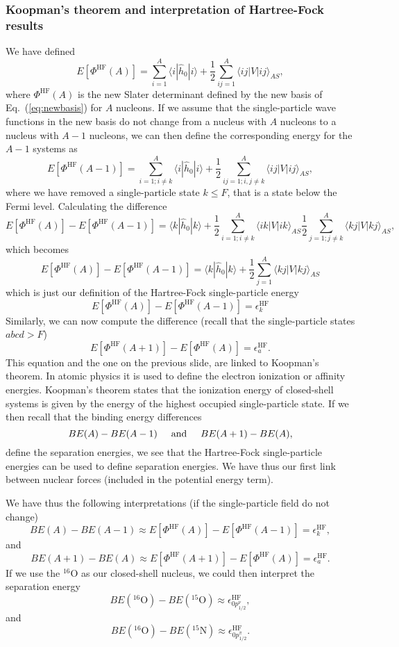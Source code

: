 \subsubsection{Koopman's theorem and interpretation of Hartree-Fock results}
We have defined 
\[
  E[\Phi^{\mathrm{HF}}(A)] 
  = \sum_{i=1}^A \langle i | \hat{h}_0 | i \rangle +
  \frac{1}{2}\sum_{ij=1}^A\langle ij|V|ij\rangle_{AS},
\]
where $\Phi^{\mathrm{HF}}(A)$ is the new Slater determinant defined by
the new basis of Eq.~(\ref{eq:newbasis}) for $A$ nucleons.  If we
assume that the single-particle wave functions in the new basis do not
change from a nucleus with $A$ nucleons to a nucleus with $A-1$
nucleons, we can then define the corresponding energy for the $A-1$
systems as
\[
  E[\Phi^{\mathrm{HF}}(A-1)] 
  = \sum_{i=1; i\ne k}^A \langle i | \hat{h}_0 | i \rangle +
  \frac{1}{2}\sum_{ij=1;i,j\ne k}^A\langle ij|V|ij\rangle_{AS},
\]
where we have removed a single-particle state $k\le F$, that is a state below the Fermi level.  
Calculating the difference 
\[
  E[\Phi^{\mathrm{HF}}(A)]-   E[\Phi^{\mathrm{HF}}(A-1)] 
  = \langle k | \hat{h}_0 | k \rangle +
  \frac{1}{2}\sum_{i=1;i\ne k}^A\langle ik|V|ik\rangle_{AS}  \frac{1}{2}\sum_{j=1;j\ne k}^A\langle kj|V|kj\rangle_{AS},
\]
which becomes 
\[
  E[\Phi^{\mathrm{HF}}(A)]-   E[\Phi^{\mathrm{HF}}(A-1)] 
  = \langle k | \hat{h}_0 | k \rangle +
  \frac{1}{2}\sum_{j=1}^A\langle kj|V|kj\rangle_{AS}
\]
which is just our definition of the Hartree-Fock single-particle energy
\[
  E[\Phi^{\mathrm{HF}}(A)]-   E[\Phi^{\mathrm{HF}}(A-1)] 
  = \epsilon_k^{\mathrm{HF}} 
\]
Similarly, we can now compute the difference (recall that the single-particle states $abcd > F$)
\[
  E[\Phi^{\mathrm{HF}}(A+1)]-   E[\Phi^{\mathrm{HF}}(A)]= \epsilon_a^{\mathrm{HF}}. 
\]
This equation and the one on the previous slide, are linked to
Koopman's theorem.  In atomic physics it is used to define the
electron ionization or affinity energies.  Koopman's theorem states
that the ionization energy of closed-shell systems is given by the
energy of the highest occupied single-particle state.  If we then
recall that the binding energy differences
\[
BE(A)-BE(A-1) \hspace{0.5cm} \mathrm{and} \hspace{0.5cm} BE(A+1)-BE(A), 
\]
define the separation energies, we see that the Hartree-Fock single-particle energies can be used to
define separation energies. We have thus our first link between nuclear forces (included in the potential energy term). 

We have thus the following interpretations (if the single-particle field do not change)
\[
BE(A)-BE(A-1)\approx  E[\Phi^{\mathrm{HF}}(A)]-   E[\Phi^{\mathrm{HF}}(A-1)] 
  = \epsilon_k^{\mathrm{HF}}, 
\]
and 
\[
BE(A+1)-BE(A)\approx  E[\Phi^{\mathrm{HF}}(A+1)]-   E[\Phi^{\mathrm{HF}}(A)] =  \epsilon_a^{\mathrm{HF}}. 
\]
If we use the $^{16}$O as our closed-shell nucleus, we could then interpret the separation energy
\[
BE(^{16}\mathrm{O})-BE(^{15}\mathrm{O})\approx \epsilon_{0p^{\nu}_{1/2}}^{\mathrm{HF}}, 
\]
and 
\[
BE(^{16}\mathrm{O})-BE(^{15}\mathrm{N})\approx \epsilon_{0p^{\pi}_{1/2}}^{\mathrm{HF}}.
\]

